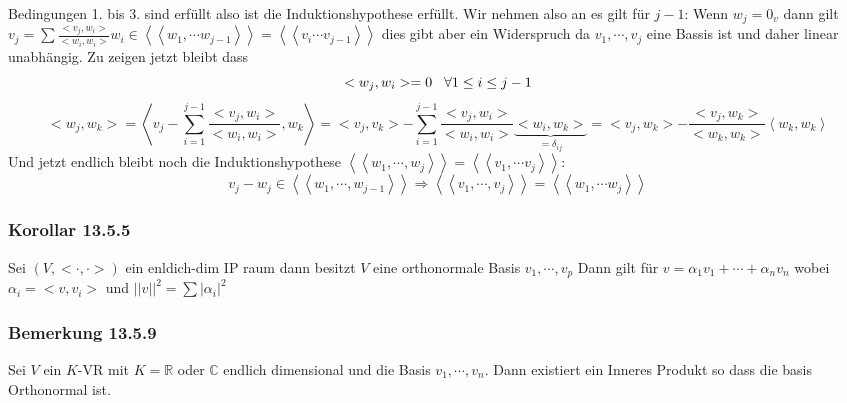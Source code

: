 \documentclass{article}
\newcommand{\smspc}{\hspace{0.3cm}}
\newcommand{\kk}[1]{\left<\left<{#1}\right>\right>}
\newcommand{\korollar}[1]{\subsubsection*{Korollar {#1}}}
\newcommand{\bemerkung}[1]{\subsubsection*{Bemerkung {#1}}}
\begin{document}
Bedingungen 1. bis 3. sind erfüllt also ist die Induktionshypothese erfüllt. Wir nehmen also an es gilt für $j-1$: 
Wenn $w_j=0_v$ dann gilt $v_j=\sum \frac{<v_j,w_i>}{<w_i,w_i>}w_i\in \kk{w_1,\cdots w_{j-1}}=\kk{v_i\cdots v_{j-1}}$ dies gibt aber ein Widerspruch da  $v_1,\cdots,v_j$ eine Bassis ist und daher linear unabhängig.
Zu zeigen jetzt bleibt dass \[<w_j,w_i>=0\smspc\forall 1\le i\le j-1\] \[<w_j,w_k>=\left<v_j-\sum_{i=1}^{j-1}\frac{<v_j,w_i>}{<w_i,w_i>}
,w_k\right>=<v_j,v_k>-\sum_{i=1}^{j-1}\frac{<v_j,w_i>}{<w_i,w_i>}\underset{=\delta_{ij}}{\underbrace{<w_i,w_k>}}=<v_j,w_k>-\frac{<v_j,w_k>}{<w_k,w_k>}\left<w_k,w_k\right>\]
Und jetzt endlich bleibt noch die Induktionshypothese $\kk{w_1,\cdots, w_{j}}=\kk{v_1,\cdots v_{j}}$:
\[v_j-w_j\in \kk{w_1,\cdots, w_{j-1}}\Rightarrow\left<\left<v_1,\cdots,v_j\right>\right>=\kk{w_1,\cdots w_j}\]
\korollar{13.5.5} Sei $(V,<\cdot,\cdot>)$ ein enldich-dim IP raum dann besitzt $V$ eine orthonormale Basis $v_1,\cdots,v_p$ Dann gilt für $v=\alpha_1v_1+\cdots+\alpha_nv_n$ wobei $\alpha_i=<v,v_i>$ und $||v||^2=\sum|\alpha_i|^2$
\bemerkung{13.5.9} Sei $V$ ein $K$-VR mit $K=\mathbb{R}$ oder $\mathbb{C}$ endlich dimensional und die Basis $v_1,\cdots,v_n$. Dann existiert ein Inneres Produkt so dass die basis Orthonormal ist.
\end{document}
